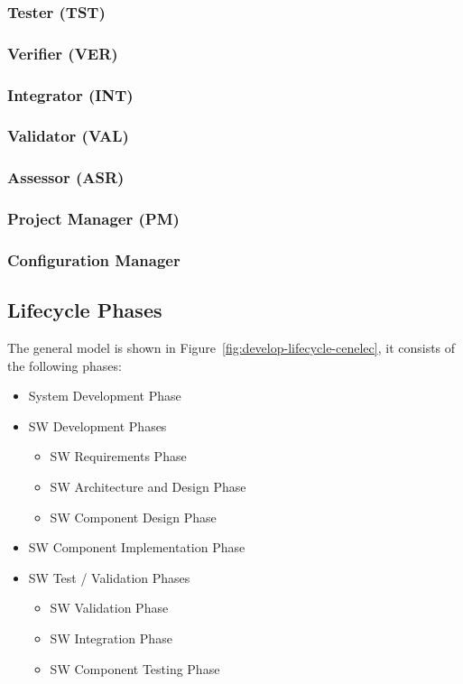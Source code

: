 \subsubsection{Tester (TST)}
\label{sec:tester}

\subsubsection{Verifier (VER)}
\label{sec:verifier}

\subsubsection{Integrator (INT)}
\label{sec:integrator}

\subsubsection{Validator (VAL)}
\label{sec:validator}

\subsubsection{Assessor (ASR)}
\label{sec:assessor}

\subsubsection{Project Manager (PM)}
\label{sec:project-manager}

\subsubsection{Configuration Manager}
\label{sec:conf-manag}


\subsection{Lifecycle Phases}
\label{sec:lifecycle-phases}

The general model is shown in Figure~\ref{fig:develop-lifecycle-cenelec}, it
consists of the following phases:

\begin{itemize}
\item System Development Phase
\item SW Development Phases
  \begin{itemize}
  \item SW Requirements Phase
  \item SW Architecture and Design Phase
  \item SW Component Design Phase
  \end{itemize}
\item SW Component Implementation Phase
\item SW Test / Validation Phases
  \begin{itemize}
  \item SW Validation Phase
  \item SW Integration Phase
  \item SW Component Testing Phase
  \end{itemize}
\end{itemize}

